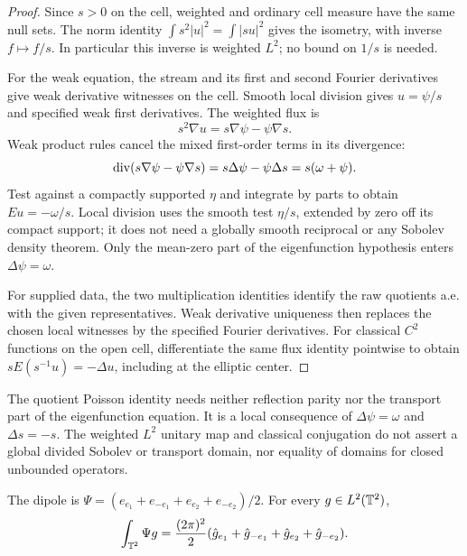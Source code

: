 \begin{proof}
\leanok
Since $s>0$ on the cell, weighted and ordinary cell measure have the same null
sets. The norm identity
$\int s^2|u|^2=\int|su|^2$ gives the isometry, with inverse $f\mapsto f/s$.
In particular this inverse is weighted $L^2$; no bound on $1/s$ is needed.

For the weak equation, the stream and its first and second Fourier derivatives
give weak derivative witnesses on the cell. Smooth local division gives
$u=\psi/s$ and specified weak first derivatives. The weighted flux is
\[
 s^2\nabla u=s\nabla\psi-\psi\nabla s.
\]
Weak product rules cancel the mixed first-order terms in its divergence:
\[
 \operatorname{div}(s\nabla\psi-\psi\nabla s)
 =s\Delta\psi-\psi\Delta s=s(\omega+\psi).
\]
Test against a compactly supported $\eta$ and integrate by parts to obtain
$Eu=-\omega/s$. Local division uses the smooth test $\eta/s$, extended
by zero off its compact support; it does not need a globally smooth reciprocal
or any Sobolev density theorem. Only the mean-zero part of the eigenfunction
hypothesis enters $\Delta\psi=\omega$.

For supplied data, the two multiplication identities identify the raw quotients
a.e. with the given representatives. Weak derivative uniqueness then replaces
the chosen local witnesses by the specified Fourier derivatives.
For classical $C^2$ functions on the open cell, differentiate the same flux
identity pointwise to obtain $sE(s^{-1}u)=-\Delta u$, including at the elliptic
center.
\end{proof}

\begin{remark}
The quotient Poisson identity needs neither reflection parity nor the transport
part of the eigenfunction equation. It is a local consequence of
$\Delta\psi=\omega$ and $\Delta s=-s$.
The weighted $L^2$ unitary map and classical conjugation do not assert a global
divided Sobolev or transport domain, nor equality of domains for closed
unbounded operators.
\end{remark}

\begin{lemma}
\label{lem:dipole-fourier-pairing}
\leanok
The dipole is $\Psi=(e_{e_1}+e_{-e_1}+e_{e_2}+e_{-e_2})/2$.
For every $g\in L^2(\mathbb{T}^2)$,
\[
 \int_{\mathbb{T}^2}\Psi g=\frac{(2\pi)^2}{2}
       (\hat g_{e_1}+\hat g_{-e_1}+\hat g_{e_2}+\hat g_{-e_2}).
\]
\end{lemma}

